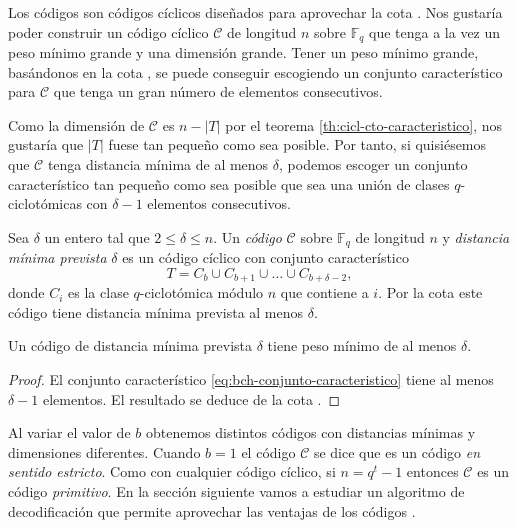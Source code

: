 Los códigos  son códigos cíclicos diseñados para aprovechar la cota .
Nos gustaría poder construir un código cíclico \(\mathcal C\) de longitud \(n\) sobre \(\mathbb F_q\) que tenga a la vez un peso mínimo grande y una dimensión grande.
Tener un peso mínimo grande, basándonos en la cota , se puede conseguir escogiendo un conjunto característico para \(\mathcal C\) que tenga un gran número de elementos consecutivos.

Como la dimensión de \(\mathcal C\) es \(n - |T|\) por el teorema \ref{th:cicl-cto-caracteristico}, nos gustaría que \(|T|\) fuese tan pequeño como sea posible.
Por tanto, si quisiésemos que \(\mathcal C\) tenga distancia mínima de al menos \(\delta\), podemos escoger un conjunto característico tan pequeño como sea posible que sea una unión de clases \(q\)-ciclotómicas con \(\delta - 1\) elementos consecutivos.

Sea \(\delta\) un entero tal que \(2 \leq \delta \leq n\). Un \textit{código } \(\mathcal C\) sobre \(\mathbb F_q\) de longitud \(n\) y \textit{distancia mínima prevista} \(\delta\) es un código cíclico con conjunto característico
\begin{equation}
  \label{eq:bch-conjunto-caracteristico}
  T = C_b \cup C_{b+1} \cup \dots \cup C_{b + \delta - 2},
\end{equation}
donde \(C_i\) es la clase \(q\)-ciclotómica módulo \(n\) que contiene a \(i\).
Por la cota  este código tiene distancia mínima prevista al menos \(\delta\).

\begin{theorem}
  Un código  de distancia mínima prevista \(\delta\) tiene peso mínimo de al menos \(\delta\).
\end{theorem}

\begin{proof}
  El conjunto característico \ref{eq:bch-conjunto-caracteristico} tiene al menos \(\delta - 1\) elementos.
  El resultado se deduce de la cota .
\end{proof}

Al variar el valor de \(b\) obtenemos distintos códigos con distancias mínimas y dimensiones diferentes.
Cuando \(b = 1\) el código \(\mathcal C\) se dice que es un código  \textit{en sentido estricto}.
Como con cualquier código cíclico, si \(n = q^t - 1\) entonces \(\mathcal C\) es un código  \textit{primitivo}.
En la sección siguiente vamos a estudiar un algoritmo de decodificación que permite aprovechar las ventajas de los códigos .

